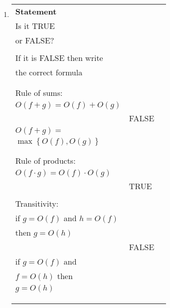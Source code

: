 \documentclass[]{article}
\begin{document}
\begin{enumerate}
\item
\begin{tabular}{|l|l|l|} \hline
{\bf Statement} & 
\begin{minipage}{20mm} ~~\\
Is it TRUE\\
or FALSE? \\ 
\end{minipage}& 
\begin{minipage}{35mm} ~~\\
If it is FALSE then write\\
the correct formula \\
\end{minipage} \\ \hline
\begin{minipage}{40mm}~~\\
Rule of sums:\\
 $O(f + g) = O(f) + O(g)$\\ 
\end{minipage}                & FALSE     &
\begin{minipage}{40mm}~~\\
  $O(f + g) =$ \\ $ \max \left\{ O(f), O(g) \right \}$\\ 
\end{minipage} \\ \hline
\begin{minipage}{40mm}~~\\
Rule of products:\\
 $O(f \cdot g) = O(f) \cdot O(g)$ \\
\end{minipage}                &  TRUE    &  \\ \hline
\begin{minipage}{40mm}~~\\
Transitivity: \\
if $g = O(f)$ and $h = O(f)$\\ then $g = O(h)$ \\
\end{minipage}                &  FALSE     & 
\begin{minipage}{40mm}~~\\
if $g = O(f)$ and \\ $f = O(h)$ then \\ $g = O(h)$ \\
\end{minipage} \\ \hline
\begin{minipage}{40mm}~~\\

\end{minipage}
\end{tabular}
\end{enumerate}
\end{document}
